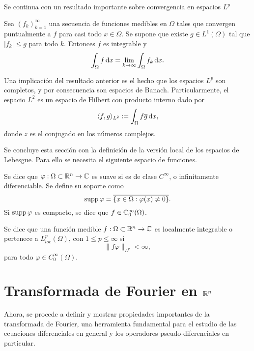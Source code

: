 Se continua con un resultado importante sobre convergencia en 
espacios $L^p$
\begin{theorem}
    Sea $(f_k)_{k=1}^\infty$ una secuencia de funciones medibles en $\Omega$ 
    tales que convergen puntualmente a $f$ para casi todo $x\in\Omega$. Se supone
    que existe $g\in L^1(\Omega)$ tal que $|f_k|\leq g$ para todo $k$. Entonces
    $f$ es integrable y 
    \begin{equation*}
        \int_\Omega f \mathop{}\!\mathrm{d} x = \lim_{k\rightarrow\infty} \int_\Omega 
        f_k \mathop{}\!\mathrm{d} x.
    \end{equation*}
\end{theorem}

\begin{remark}
    Una implicación del resultado anterior es el hecho que los espacios $L^p$ son 
    completos, y por consecuencia son espacios de Banach. Particularmente, el 
    espacio $L^2$ es un espacio de Hilbert con producto interno dado por
    \begin{equation*}
        \langle f, g\rangle_{L^2} := \int_\Omega f\overline{g}\mathop{}\!\mathrm{d} x,
    \end{equation*}
    donde $\overline{z}$ es el conjugado en los números complejos.
\end{remark}
Se concluye esta sección con la definición de la versión local de los espacios de Lebesgue. Para ello se necesita el siguiente espacio de funciones.
\begin{definition}
		Se dice que $\varphi:\Omega\subset\mathbb{R}^n\rightarrow\mathbb{C}$ es suave si es de clase $C^\infty$, o infinitamente diferenciable.  Se define su soporte como 
		\begin{equation*}
			\operatorname{supp} \varphi = \overline{\{x\in\Omega:\varphi(x)\neq 0\}}.
		\end{equation*}
		Si $\operatorname{supp} \varphi$ es compacto, se dice que $f\in\mathbb{C}^\infty_0(\Omega)$.
\end{definition}
\begin{definition}
	Se dice que una función medible $f:\Omega\subset\mathbb{R}^n\rightarrow\mathbb{C}$ es localmente integrable o pertenece a $L^{p}_{loc}(\Omega)$, con $1\leq p\leq\infty$ si 
	\begin{equation*}
		\|f\varphi\|_{L^p} < \infty,
	\end{equation*} 
	para todo $\varphi\in C^\infty_0(\Omega)$.
\end{definition}
\section{Transformada de Fourier en $\mathbb{R}^n$}
Ahora, se procede a definir y mostrar propiedades importantes de la
transformada de Fourier, una herramienta fundamental para el estudio
de las ecuaciones diferenciales en general y los operadores
pseudo-diferenciales en particular. 

